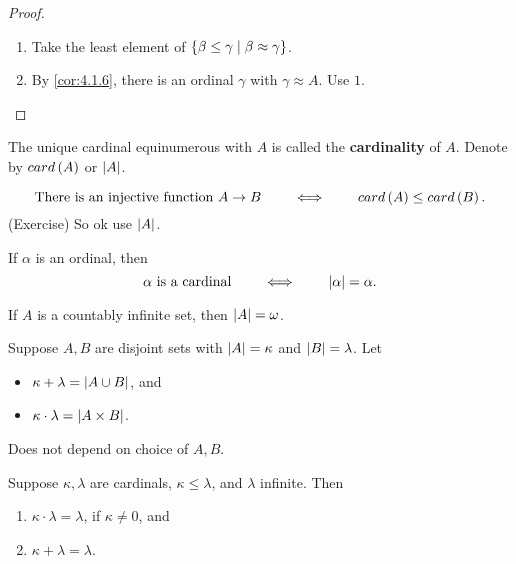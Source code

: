 \begin{proof}
\hfill
\begin{enumerate}
\item Take the least element of $ \left\{ \beta \le \gamma \mid \beta \approx \gamma \right\} $.
\item By \ref{cor:4.1.6}, there is an ordinal $ \gamma $ with $ \gamma \approx A $. Use $ 1 $.
\end{enumerate}
\end{proof}

\begin{definition}
The unique cardinal equinumerous with $ A $ is called the \textbf{cardinality} of $ A $. Denote by $ card\left( A \right) $ or $ \left\lvert A \right\rvert $.
\end{definition}

\begin{remark*}
$$ \text{There is an injective function} \ A \to B \qquad \iff \qquad card\rb{A} \le card\rb{B}. $$
(Exercise) So ok use $ \left\lvert A \right\rvert $.
\end{remark*}

If $ \alpha $ is an ordinal, then
$$ \alpha \ \text{is a cardinal} \qquad \iff \qquad \left\lvert \alpha \right\rvert = \alpha. $$

\begin{example*}
If $ A $ is a countably infinite set, then $ \left\lvert A \right\rvert = \omega $.
\end{example*}

\begin{definition}
Suppose $ A, B $ are disjoint sets with $ \left\lvert A \right\rvert = \kappa $ and $ \left\lvert B \right\rvert = \lambda $. Let
\begin{itemize}
\item $ \kappa + \lambda = \left\lvert A \cup B \right\rvert $, and
\item $ \kappa \cdot \lambda = \left\lvert A \times B \right\rvert $.
\end{itemize}
\end{definition}

\begin{remark*}
Does not depend on choice of $ A, B $.
\end{remark*}

\begin{theorem}
\label{thm:4.2.5}
Suppose $ \kappa, \lambda $ are cardinals, $ \kappa \le \lambda $, and $ \lambda $ infinite. Then
\begin{enumerate}
\item $ \kappa \cdot \lambda = \lambda $, if $ \kappa \ne 0 $, and
\item $ \kappa + \lambda = \lambda $.
\end{enumerate}
\end{theorem}

